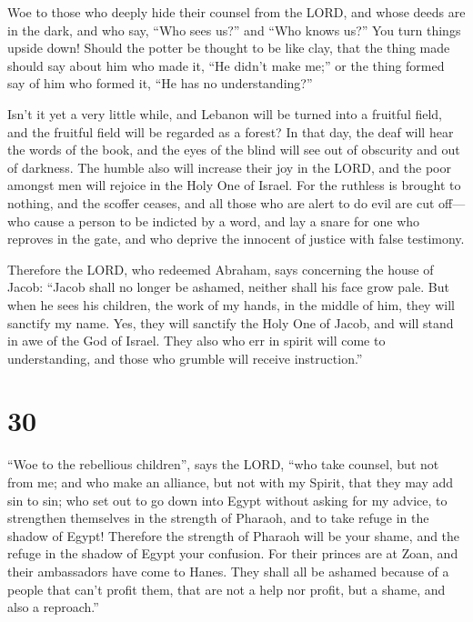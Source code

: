  Woe to those who deeply hide their counsel from the
LORD, and whose deeds are in the dark, and who say, ``Who sees us?'' and
``Who knows us?''  You turn things upside down! Should
the potter be thought to be like clay, that the thing made should say
about him who made it, ``He didn't make me;'' or the thing formed say of
him who formed it, ``He has no understanding?''

 Isn't it yet a very little while, and Lebanon will be
turned into a fruitful field, and the fruitful field will be regarded as
a forest?  In that day, the deaf will hear the words of
the book, and the eyes of the blind will see out of obscurity and out of
darkness.  The humble also will increase their joy in the
LORD, and the poor amongst men will rejoice in the Holy One of Israel.
 For the ruthless is brought to nothing, and the scoffer
ceases, and all those who are alert to do evil are cut off---
 who cause a person to be indicted by a word, and lay a
snare for one who reproves in the gate, and who deprive the innocent of
justice with false testimony.

 Therefore the LORD, who redeemed Abraham, says
concerning the house of Jacob: ``Jacob shall no longer be ashamed,
neither shall his face grow pale.  But when he sees his
children, the work of my hands, in the middle of him, they will sanctify
my name. Yes, they will sanctify the Holy One of Jacob, and will stand
in awe of the God of Israel.  They also who err in spirit
will come to understanding, and those who grumble will receive
instruction.''

\hypertarget{section-29}{%
\section{30}\label{section-29}}

 ``Woe to the rebellious children'', says the LORD, ``who
take counsel, but not from me; and who make an alliance, but not with my
Spirit, that they may add sin to sin;  who set out to go
down into Egypt without asking for my advice, to strengthen themselves
in the strength of Pharaoh, and to take refuge in the shadow of Egypt!
 Therefore the strength of Pharaoh will be your shame, and
the refuge in the shadow of Egypt your confusion.  For
their princes are at Zoan, and their ambassadors have come to Hanes.
 They shall all be ashamed because of a people that can't
profit them, that are not a help nor profit, but a shame, and also a
reproach.''


